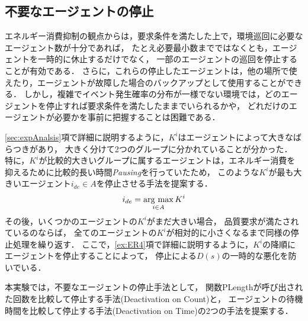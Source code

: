 \documentclass[12pt,a4j,twoside]{jarticle}
\newcommand{\argmax}{\mathop{\rm arg~max}\limits}
\def\AgentSet{A}
\begin{document}
  \subsection{不要なエージェントの停止}\label{sec:deactivation}
  エネルギー消費抑制の観点からは，要求条件を満たした上で，環境巡回に必要なエージェント数が十分であれば，
  たとえ必要最小数までではなくとも，エージェントを一時的に休止するだけでなく，
  一部のエージェントの巡回を停止することが有効である．
  さらに，これらの停止したエージェントは，他の場所で使えたり，エージェントが故障した場合のバックアップとして使用することができる．
  しかし，複雑でイベント発生確率の分布が一様でない環境では，どのエージェントを停止すれば要求条件を満たしたままでいられるかや，
  どれだけのエージェントが必要かを事前に把握することは困難である．
  \par

  \ref{sec:expAnalsis}項で詳細に説明するように，$K^i$はエージェントによって大きなばらつきがあり，
  大きく分けて2つのグループに分かれていることが分かった．
  特に，$K^i$が比較的大きいグループに属するエージェントは，エネルギー消費を抑えるために比較的長い時間{\em Pausing}を行っていたため，
  このような$K^i$が最も大きいエージェント$i_{de}\in\AgentSet$を停止させる手法を提案する．
  \begin{equation}
    i_{de} = \argmax_{i\in\AgentSet} K^i
  \end{equation}
  その後，いくつかのエージェントの$K^i$がまだ大きい場合，
  品質要求が満たされているのならば，
  全てのエージェントの$K^i$が相対的に小さくなるまで同様の停止処理を繰り返す．
  ここで，\ref{ex:ER4}項で詳細に説明するように，$K^i$の降順にエージェントを停止することによって，
  停止による$D(s)$の一時的な悪化を防いでいる．
  \par

  本実験では，不要なエージェントの停止手法として，
  関数\textsf{PLength}が呼び出された回数を比較して停止する手法(Deactivation on Count)と，
  エージェントの待機時間を比較して停止する手法(Deactivation on Time)の2つの手法を提案する．
\end{document}
